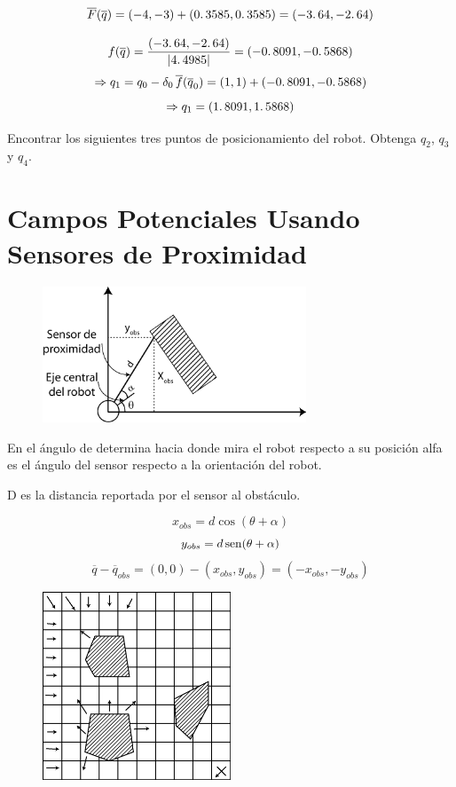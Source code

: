 $$\overline{F}(\overline{q}) = (-4,-3) + (0\ldotp3585,0\ldotp3585) = (-3\ldotp64,-2\ldotp64)$$

$$f(\overline{q}) = \dfrac{(-3\ldotp64,-2\ldotp64)}{|4\ldotp4985|} = (-0\ldotp8091,-0\ldotp5868)$$
$$ \Rightarrow q_{1} = q_{0} - \delta_{0}\,\overline{f}(\overline{q}_{0}) = (1,1) + (-0\ldotp8091,-0\ldotp5868)$$
$$\Rightarrow q_{1} = (1\ldotp8091,1\ldotp5868)$$

Encontrar los siguientes tres puntos de posicionamiento del robot. Obtenga $q_{2}$, $q_{3}$ y $q_{4}$.


\section{Campos Potenciales Usando Sensores de Proximidad}

\begin{figure}[h!]
	\centering
	\includegraphics[width=0.7\textwidth]{images/img17.png}
	\label{figura17}
\end{figure}

En el ángulo de determina hacia donde mira el robot respecto a su posición alfa es el ángulo del sensor respecto a la orientación del robot. 

D es la distancia reportada por el sensor al obstáculo. 

$$x_{obs} = d\cos (\theta + \alpha)$$
$$y_{obs} = d\mathop{\rm sen}\nolimits (\theta + \alpha)$$
$$\overline{q} - \overline{q}_{obs} = (0,0) - (x_{obs}, y_{obs}) = (-x_{obs}, -y_{obs})$$

\begin{figure}[h!]
	\centering
	\includegraphics[width=0.5\textwidth]{images/img18.png}
	\label{figura18}
\end{figure}
\newpage

